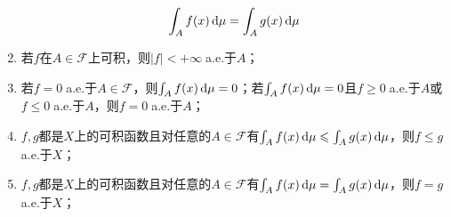 \begin{property}
\begin{enumerate}
\begin{equation*}
			\int_{A}^{}f(x)\mathop{}\!\mathrm{d}\mu=\int_{A}^{}g(x)\mathop{}\!\mathrm{d}\mu
		\end{equation*}
		\item 若$f$在$A\in\mathscr{F}$上可积，则$|f|<+\infty\;$a.e.于$A$；
		\item 若$f=0\;$a.e.于$A\in \mathscr{F}$，则$\int_{A}^{}f(x)\mathop{}\!\mathrm{d}\mu=0$；若$\int_{A}^{}f(x)\mathop{}\!\mathrm{d}\mu=0$且$f\geqslant0\;$a.e.于$A$或$f\leqslant0\;$a.e.于$A$，则$f=0\;$a.e.于$A$；
		\item $f,g$都是$X$上的可积函数且对任意的$A\in \mathscr{F}$有$\int_{A}^{}f(x)\mathop{}\!\mathrm{d}\mu\leqslant\int_{A}^{}g(x)\mathop{}\!\mathrm{d}\mu$，则$f\leqslant g\;$a.e.于$X$；
		\item $f,g$都是$X$上的可积函数且对任意的$A\in \mathscr{F}$有$\int_{A}^{}f(x)\mathop{}\!\mathrm{d}\mu=\int_{A}^{}g(x)\mathop{}\!\mathrm{d}\mu$，则$f=g\;$a.e.于$X$；
	\end{enumerate}
\end{property}
